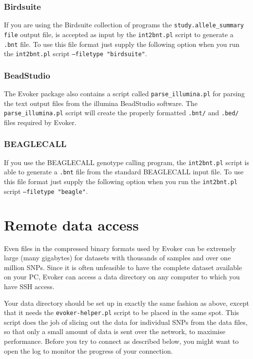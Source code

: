 \documentclass{article}
\begin{document}
\subsubsection{Birdsuite}
If you are using the Birdsuite collection of programs the \texttt{study.allele\_summary file} output file, is accepted as input by the \texttt{int2bnt.pl} script to generate a \texttt{.bnt} file. To use this file format just supply the following option when you run the \texttt{int2bnt.pl} script \texttt{--filetype "birdsuite"}.

\subsubsection{BeadStudio}
The Evoker package also contains a script called \texttt{parse\_illumina.pl} for parsing the text output files from the illumina BeadStudio software. The \texttt{parse\_illumina.pl} script will create the properly formatted \texttt{.bnt/} and \texttt{.bed/} files required by Evoker. 

\subsubsection{BEAGLECALL}
If you use the BEAGLECALL genotype calling program, the \texttt{int2bnt.pl} script is able to generate a \texttt{.bnt} file from the standard BEAGLECALL input file. To use this file format just supply the following option when you run the \texttt{int2bnt.pl} script \texttt{--filetype "beagle"}.

\section{Remote data access}

Even files in the compressed binary formats used by Evoker can be extremely large (many gigabytes) for datasets with thousands of samples and over one million SNPs. Since it is often unfeasible to have the complete dataset available on your PC, Evoker can access a data directory on any computer to which you have SSH access.

Your data directory should be set up in exactly the same fashion as above, except that it needs the \texttt{evoker-helper.pl} script to be placed in the same spot. This script does the job of slicing out the data for individual SNPs from the data files, so that only a small amount of data is sent over the network, to maximise performance. Before you try to connect as described below, you might want to open the log to monitor the progress of your connection.
\end{document}
